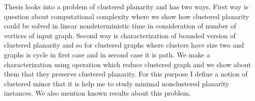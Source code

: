 \documentclass[12pt,a4report]{report}
\begin{document}
\author{Filip Šedivý}

Thesis looks into a problem of clustered planarity and has two ways. First way is question about computational complexity where we show how clustered planarity could be solved in linear nondeterministic time in consideration of number of vertices of input graph. Second way is characterization of bounded version of clustered planarity and so for clustered graphs where clusters have size two and graphs is cycle in first case and in second case it is path. We make a characterization using operation which reduce clustered graph and we show about them that they preserve clustered planarity. For this purpose I define a notion of clustered minor that it is help me to study minimal nonclustered planarity instances. We also mention known results about this problem.
\end{document}
